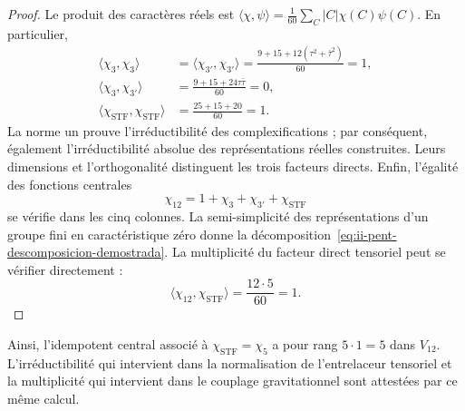 \begin{proof}
Le produit des caractères réels est
\(\langle\chi,\psi\rangle
=\frac1{60}\sum_C|C|\chi(C)\psi(C)\).
En particulier,
\begin{align*}
 \langle\chi_3,\chi_3\rangle
 &=\langle\chi_{3'},\chi_{3'}\rangle
 =\frac{9+15+12(\tau^2+\bar\tau^2)}{60}=1,\\
 \langle\chi_3,\chi_{3'}\rangle
 &=\frac{9+15+24\tau\bar\tau}{60}=0,\\
 \langle\chi_{\mathrm{STF}},\chi_{\mathrm{STF}}\rangle
 &=\frac{25+15+20}{60}=1.
\end{align*}
La norme un prouve l’irréductibilité des complexifications ; par
conséquent, également l’irréductibilité absolue des représentations
réelles construites. Leurs dimensions et l’orthogonalité distinguent les
trois facteurs directs. Enfin, l’égalité des fonctions centrales
\[
 \chi_{12}=1+\chi_3+\chi_{3'}+\chi_{\mathrm{STF}}
\]
se vérifie dans les cinq colonnes. La semi-simplicité des
représentations d’un groupe fini en caractéristique zéro donne la
décomposition~\eqref{eq:ii-pent-descomposicion-demostrada}. La
multiplicité du facteur direct tensoriel peut se vérifier directement :
\[
 \langle\chi_{12},\chi_{\mathrm{STF}}\rangle
 =\frac{12\cdot5}{60}=1.
\]
\end{proof}

Ainsi, l’idempotent central associé à
\(\chi_{\mathrm{STF}}=\chi_5\) a pour rang
\(5\cdot1=5\) dans \(V_{12}\). L’irréductibilité qui intervient
dans la normalisation de l’entrelaceur tensoriel et la multiplicité qui
intervient dans le couplage gravitationnel sont attestées par
ce même calcul.
